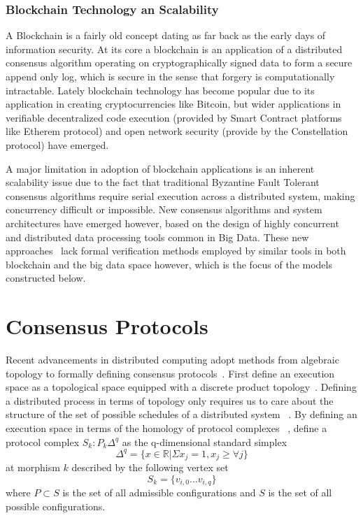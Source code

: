 \documentclass[runningheads]{llncs}
\begin{document}
\subsubsection{Blockchain Technology an Scalability}
A Blockchain is a fairly old concept dating as far back as the early days of information security. At its core a blockchain is an application of a distributed consensus algorithm operating on cryptographically signed data to form a secure append only log, which is secure in the sense that forgery is computationally intractable. Lately blockchain technology has become popular due to its application in creating cryptocurrencies like Bitcoin, but wider applications in verifiable decentralized code execution (provided by Smart Contract platforms like Etherem protocol) and open network security (provide by the Constellation protocol) have emerged. 

A major limitation in adoption of blockchain applications is an inherent scalability issue due to the fact that traditional Byzantine Fault Tolerant consensus algorithms require serial execution across a distributed system, making concurrency difficult or impossible. New consensus algorithms and system architectures have emerged however, based on the design of highly concurrent and distributed data processing tools common in Big Data. These new approaches~\cite{ref_url3,ref_url6} lack formal verification methods employed by similar tools in both blockchain and the big data space however, which is the focus of the models constructed below.

\section{Consensus Protocols}
Recent advancements in distributed computing adopt methods from algebraic topology to formally defining consensus protocols~\cite{ref_article1,ref_article2}. First define an execution space as a topological space equipped with a discrete product topology~\cite{ref_article3}. Defining a distributed process in terms of topology only requires us to care about the structure of the set of possible schedules of a distributed system ~\cite{ref_article4}. By defining an execution space in terms of the homology of protocol complexes ~\cite{ref_article2}, define a protocol complex $S_k: P_k{\Delta^q}$ as the q-dimensional standard simplex
\begin{equation}
\Delta^q = \{x \in \mathbb{R} | \Sigma x_j = 1, x_j \geq \forall j \}
\end{equation} 
at morphism $k$ described by the following vertex set
\begin{equation}
S_k = \{v_{i,0} \dots v_{i,q}\}
\end{equation}
where $P \subset S$ is the set of all admissible configurations and $S$ is the set of all possible configurations.
\end{document}
